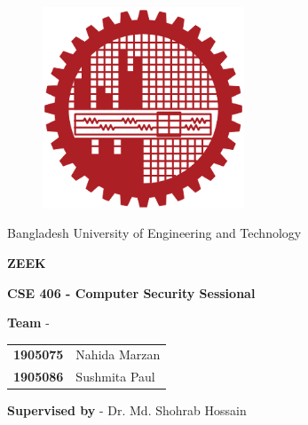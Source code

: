 \documentclass{article}
\begin{document}
\begin{figure}[htp]
    \centering
    \includegraphics[width=6cm]{buet_logo.png}
    \label{fig:logo}
\end{figure}

\begin{center}
    \huge{Bangladesh University of Engineering and Technology}
\end{center}

\vspace{1cm}
\begin{center}
    \parbox{\linewidth}{\centering %
        \huge \textbf{ZEEK}
    }
\end{center}
\vspace{1cm}
\begin{center}
    \parbox{\linewidth}{\centering %
        \Large \textbf{CSE 406 - Computer Security Sessional}
    }
\end{center}

\vspace{1cm}
\begin{flushleft}
\Large \hspace{6pt}\textbf{Team} - \\
\vspace{10pt}
\begin{tabular}{ll} %
\Large \textbf{1905075} & \Large Nahida Marzan 
\\
\Large \textbf{1905086} & \Large Sushmita Paul
\end{tabular}
\end{flushleft}

\vspace{1cm}
\begin{flushleft}
    \Large \hspace{6pt}\textbf{Supervised by} - Dr. Md. Shohrab Hossain
\end{flushleft}
\end{document}
